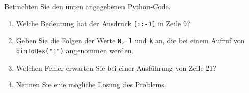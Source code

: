 Betrachten Sie den unten angegebenen Python-Code.
\begin{enumerate}
	\item Welche Bedeutung hat der Ausdruck \verb|[::-1]| in Zeile 9?
	\item Geben Sie die Folgen der Werte \verb|N, l| und \verb|k| an, die bei einem Aufruf von \verb|binToHex("1")| angenommen werden.
	\item Welchen Fehler erwarten Sie bei einer Ausführung von Zeile 21?
	\item Nennen Sie eine mögliche Lösung des Problems. 
\end{enumerate}

